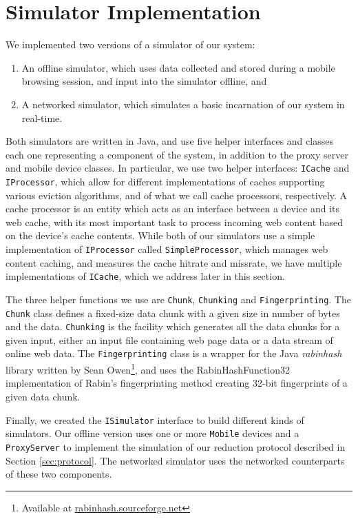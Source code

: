 \section{Simulator Implementation}
We implemented two versions of a simulator of our system: 
\begin{enumerate}
\item An offline simulator, which uses data collected and stored during a mobile browsing session, and input into the simulator offline, and
\item A networked simulator, which simulates a basic incarnation of our system in real-time.
\end{enumerate}
Both simulators are written in Java, and use five helper interfaces and classes each one representing a component of the system, in addition to the proxy server and mobile device classes. In particular, we use two helper interfaces: \texttt{ICache} and \texttt{IProcessor}, which allow for different implementations of caches supporting various eviction algorithms, and of what we call cache processors, respectively. A cache processor is an entity which acts as an interface between a device and its web cache, with its most important task to process incoming web content based on the device's cache contents. While both of our simulators use a simple implementation of \texttt{IProcessor} called \texttt{SimpleProcessor}, which manages web content caching, and measures the cache hitrate and missrate, we have multiple implementations of \texttt{ICache}, which we address later in this section. 

The three helper functions we use are \texttt{Chunk}, \texttt{Chunking} and \texttt{Fingerprinting}. The \texttt{Chunk} class defines a fixed-size data chunk with a given size in number of bytes and the data. \texttt{Chunking} is the facility which generates all the data chunks for a given input, either an input file containing web page data or a data stream of online web data. The \texttt{Fingerprinting} class is a wrapper for the Java \emph{rabinhash} library written by Sean Owen\footnote{Available at \url{rabinhash.sourceforge.net}}, and uses the RabinHashFunction32 implementation of Rabin's fingerprinting method creating 32-bit fingerprints of a given data chunk.

Finally, we created the \texttt{ISimulator} interface to build different kinds of simulators. Our offline version uses one or more \texttt{Mobile} devices and a \texttt{ProxyServer} to implement the simulation of our reduction protocol described in Section \ref{sec:protocol}. The networked simulator uses the networked counterparts of these two components.



